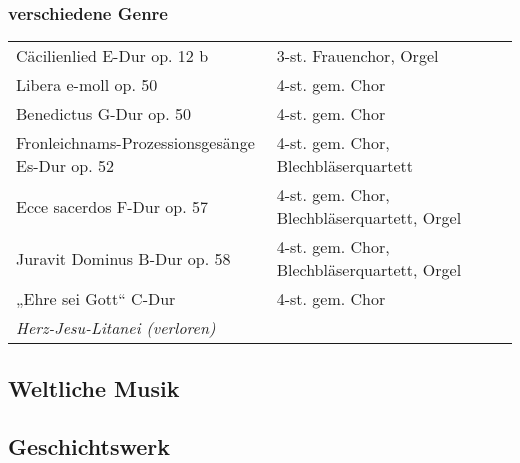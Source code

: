 \documentclass{book}
\begin{document}
\subsubsection{verschiedene Genre}

\begin{tabular}{ll}
Cäcilienlied E-Dur op. 12 b &
3-st. Frauenchor, Orgel\\

Libera e-moll op. 50 &
4-st. gem. Chor\\

Benedictus G-Dur op. 50 &
4-st. gem. Chor\\

Fronleichnams-Prozessionsgesänge Es-Dur op. 52 &
4-st. gem. Chor, Blechbläserquartett\\

Ecce sacerdos F-Dur op. 57 &
4-st. gem. Chor, Blechbläserquartett, Orgel\\

Juravit Dominus B-Dur op. 58 &
4-st. gem. Chor, Blechbläserquartett, Orgel\\

„Ehre sei Gott“ C-Dur &
4-st. gem. Chor\\

{\itshape Herz-Jesu-Litanei (verloren)} &
\\
\end{tabular}

\subsection{Weltliche Musik}


\subsection{Geschichtswerk}
\end{document}
